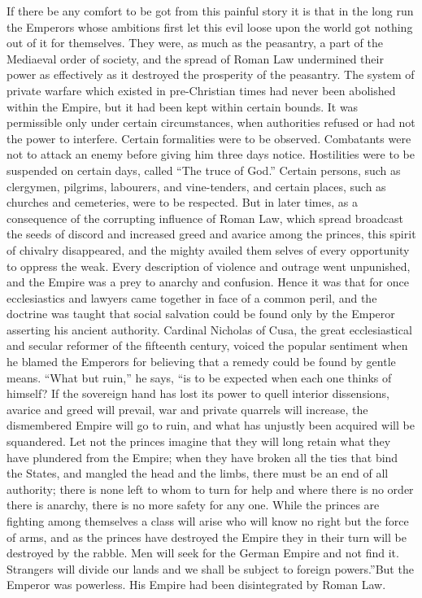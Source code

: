 \documentclass{book}
\begin{document}
If there be any comfort to be got from this painful story it is that in the long run the Emperors whose ambitions first let this evil loose upon the world got nothing out of it for themselves. They were, as much as the peasantry, a part of the Mediaeval order of society, and the spread of Roman Law undermined their power as effectively as it destroyed the prosperity of the peasantry. The system of private warfare which existed in pre-Christian times had never been abolished within the Empire, but it had been kept within certain bounds. It was permissible only under certain circumstances, when authorities refused or had not the power to interfere. Certain formalities were to be observed. Combatants were not to attack an enemy before giving him three days notice. Hostilities were to be suspended on certain days, called “The truce of God.” Certain persons, such as clergymen, pilgrims, labourers, and vine-tenders, and certain places, such as churches and cemeteries, were to be respected. But in later times, as a consequence of the corrupting influence of Roman Law, which spread broadcast the seeds of discord and increased greed and avarice among the princes, this spirit of chivalry disappeared, and the mighty availed them selves of every opportunity to oppress the weak. Every description of violence and outrage went unpunished, and the Empire was a prey to anarchy and confusion. Hence it was that for once ecclesiastics and lawyers came together in face of a common peril, and the doctrine was taught that social salvation could be found only by the Emperor asserting his ancient authority. Cardinal Nicholas of Cusa, the great ecclesiastical and secular reformer of the fifteenth century, voiced the popular sentiment when he blamed the Emperors for believing that a remedy could be found by gentle means. “What but ruin,” he says, “is to be expected when each one thinks of himself? If the sovereign hand has lost its power to quell interior dissensions, avarice and greed will prevail, war and private quarrels will increase, the dismembered Empire will go to ruin, and what has unjustly been acquired will be squandered. Let not the princes imagine that they will long retain what they have plundered from the Empire; when they have broken all the ties that bind the States, and mangled the head and the limbs, there must be an end of all authority; there is none left to whom to turn for help and where there is no order there is anarchy, there is no more safety for any one. While the princes are fighting among themselves a class will arise who will know no right but the force of arms, and as the princes have destroyed the Empire they in their turn will be destroyed by the rabble. Men will seek for the German Empire and not find it. Strangers will divide our lands and we shall be subject to foreign powers.”\footnotemark[11] But the Emperor was powerless. His Empire had been disintegrated by Roman Law.
\end{document}
